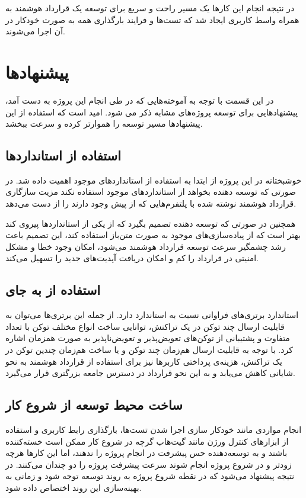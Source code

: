 در نتیجه انجام این کارها یک مسیر راحت و سریع برای توسعه یک قرارداد هوشمند به همراه واسط کاربری ایجاد شد که تست‌ها و فرایند بارگذاری همه به صورت خودکار در آن اجرا می‌شوند.



\section{پیشنهادها}
در این قسمت با توجه به آموخته‌هایی که در طی انجام این پروژه به دست آمد،
پیشنهادهایی برای توسعه پروژه‌های مشابه ذکر می شود.
امید است که استفاده از این پیشنهادها مسیر توسعه را هموارتر کرده و سرعت ببخشد.

\subsection{استفاده از استانداردها}
خوشبختانه در این پروژه از ابتدا به استفاده از استانداردهای موجود اهمیت داده شد.
در صورتی که توسعه دهنده بخواهد از استانداردهای موجود استفاده نکند مزیت سازگاری
قرارداد هوشمند نوشته شده با پلتفرم‌هایی که از پیش وجود دارند را از دست می‌دهد.

همچنین در صورتی که توسعه دهنده تصمیم بگیرد که از یکی از استانداردها پیروی کند
بهتر است که از پیاده‌سازی‌های موجود به صورت متن‌باز استفاده کند، این تصمیم باعث
رشد چشمگیر سرعت توسعه قرارداد هوشمند می‌شود، امکان وجود خطا و مشکل امنیتی در قرارداد را کم
و امکان دریافت آپدیت‌های جدید را تسهیل می‌کند.


\subsection{استفاده از  به جای }
استاندارد
برتری‌های فراوانی نسبت به استاندارد
دارد.
از جمله این برتری‌ها می‌توان به قابلیت ارسال چند توکن در یک تراکنش،
توانایی ساخت انواع مختلف توکن با تعداد متفاوت و
پشتیبانی از توکن‌های تعویض‌پذیر و تعویض‌ناپذیر به صورت همزمان اشاره کرد.
با توجه به قابلیت ارسال هم‌زمان چند توکن و یا ساخت هم‌زمان چندین توکن در یک تراکنش، هزینه‌ی پرداختی کاربرها نیز
برای استفاده از قرارداد هوشمند به نحو شایانی کاهش می‌یابد و به این نحو قرارداد در دسترس
جامعه بزرگتری قرار می‌گیرد.

\subsection{ساخت محیط توسعه از شروع کار}
انجام مواردی مانند خودکار سازی اجرا شدن تست‌ها، بارگذاری رابط کاربری و استفاده از ابزارهای کنترل ورژن مانند گیت‌هاب
گرچه در شروع کار ممکن است خسته‌کننده باشند و به توسعه‌دهنده حس پیشرفت در انجام پروژه را ندهند، اما
این کارها هرچه زودتر و در شروع پروژه انجام شوند سرعت پیشرفت پروژه را دو چندان می‌کنند.
در نتیجه پیشنهاد می‌شود که در نقطه شروع پروژه به روند توسعه توجه شود و زمانی به
بهینه‌سازی این روند اختصاص داده شود.


